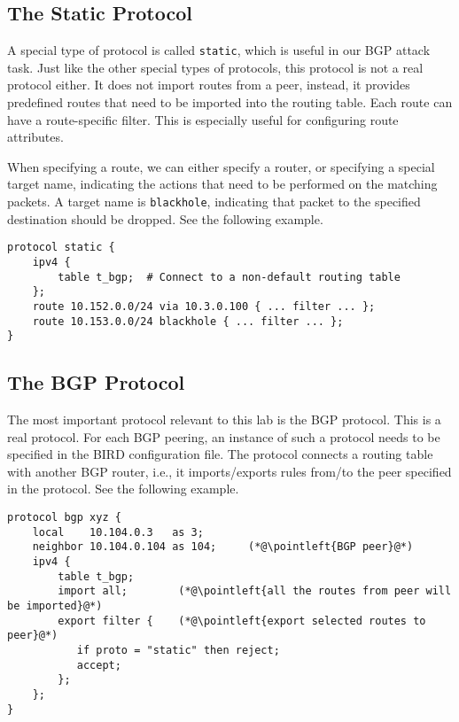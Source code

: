 \subsection{The Static Protocol} 

A special type of protocol is called \texttt{static}, which is 
useful in our BGP attack task. Just like the other special
types of protocols, this protocol is not a real protocol either.
It does not import routes from a peer, instead, it provides 
predefined routes that need to be imported into 
the routing table. Each route can have a route-specific
filter. This is especially useful for configuring route attributes. 

When specifying a route, we can either specify a router, or 
specifying a special target name, indicating the actions 
that need to be performed on the matching packets. 
A target name is \texttt{blackhole},
indicating that packet to the specified destination should be 
dropped. See the following example.

\begin{lstlisting}
protocol static {
    ipv4 {
        table t_bgp;  # Connect to a non-default routing table
    };
    route 10.152.0.0/24 via 10.3.0.100 { ... filter ... };
    route 10.153.0.0/24 blackhole { ... filter ... };
}
\end{lstlisting}


\subsection{The BGP Protocol} 

The most important protocol relevant to this lab is the BGP protocol.
This is a real protocol. For each BGP peering, an instance of 
such a protocol needs to be specified in the BIRD configuration 
file. The protocol connects a routing table with another 
BGP router, i.e., it imports/exports rules from/to 
the peer specified in the protocol.
See the following example. 

\begin{lstlisting}
protocol bgp xyz {
    local    10.104.0.3   as 3;
    neighbor 10.104.0.104 as 104;     (*@\pointleft{BGP peer}@*)
    ipv4 {
        table t_bgp;
        import all;        (*@\pointleft{all the routes from peer will be imported}@*)
        export filter {    (*@\pointleft{export selected routes to peer}@*)
           if proto = "static" then reject;
           accept;
        };
    };
}
\end{lstlisting}

